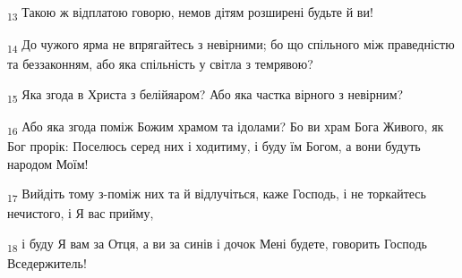 \begin{tcolorbox}
\textsubscript{13} Такою ж відплатою говорю, немов дітям розширені будьте й ви!
\end{tcolorbox}
\begin{tcolorbox}
\textsubscript{14} До чужого ярма не впрягайтесь з невірними; бо що спільного між праведністю та беззаконням, або яка спільність у світла з темрявою?
\end{tcolorbox}
\begin{tcolorbox}
\textsubscript{15} Яка згода в Христа з белійяаром? Або яка частка вірного з невірним?
\end{tcolorbox}
\begin{tcolorbox}
\textsubscript{16} Або яка згода поміж Божим храмом та ідолами? Бо ви храм Бога Живого, як Бог прорік: Поселюсь серед них і ходитиму, і буду їм Богом, а вони будуть народом Моїм!
\end{tcolorbox}
\begin{tcolorbox}
\textsubscript{17} Вийдіть тому з-поміж них та й відлучіться, каже Господь, і не торкайтесь нечистого, і Я вас прийму,
\end{tcolorbox}
\begin{tcolorbox}
\textsubscript{18} і буду Я вам за Отця, а ви за синів і дочок Мені будете, говорить Господь Вседержитель!
\end{tcolorbox}
